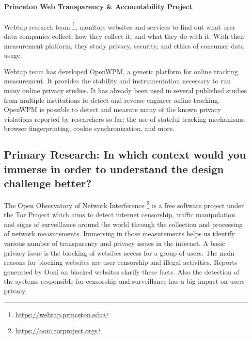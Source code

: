 \paragraph{Princeton Web Transparency \& Accountability Project\\}

Webtap research team \footnote{\url{https://webtap.princeton.edu}}, monitors 
websites and services to find out what user data 
companies collect, how they collect it, and what they do with it. With their 
measurement platform, they study privacy, security, and ethics of consumer data 
usage.

Webtap team has developed  OpenWPM, a generic platform for online tracking 
measurement. It provides the stability and instrumentation necessary to run many 
online privacy studies. It has already been used in several published studies 
from multiple institutions to detect and reverse engineer online tracking.
OpenWPM  is possible to detect and measure many of the known privacy violations 
reported by researchers so far: the use of stateful tracking mechanisms, browser 
fingerprinting, cookie synchronization, and more.

\vspace{1cm}
\subsection{Primary Research: In which context would you immerse in order to 
understand the design challenge better?}
\vspace{0.7cm}

The Open Observatory of Network Interference 
\footnote{\url{https://ooni.torproject.org}} is a free software project under 
the Tor Project which aims to detect internet censorship, traffic manipulation 
and signs of surveillance around the world through the collection and processing 
of network measurements. Immersing in those measurements helps us identify 
various number of transparency and privacy issues in the internet.  
A basic privacy issue is the blocking of websites  access for a group of users. 
The main reasons for blocking websites are user censorship and illegal 
activities. Reports generated by Ooni  on blocked websites clarify these facts. 
Also the detection of the systems responsible for censorship and surveillance 
has a big impact on users privacy.

